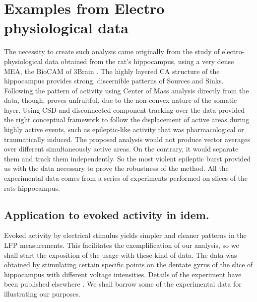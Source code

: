 \documentclass[12pt]{article}
\begin{document}
 
\section{Examples from Electro physiological data}

The necessity to create such analysis came originally from the study of
electro-physiological data obtained from the rat's hippocampus, using
a very dense MEA, the BioCAM of 3Brain \cite{BioCAM}. 
The highly layered CA structure of the hippocampus provides strong, discernible patterns of Sources and Sinks. Following the pattern of activity using Center of Mass analysis directly from the data, though, proves unfruitful, due to the non-convex nature of the somatic layer. Using CSD and disconnected component tracking over the data provided the right conceptual framework to follow the displacement of active areas during highly active events, such as epileptic-like activity that was pharmacological
or traumatically induced. The proposed analysis would not produce vector averages over different simultaneously active areas. On the contrary, it would separate them and track them independently. So the most violent epileptic burst provided us with the data necessary to prove the robustness of the method.
All the experimental data comes from a series of experiments
performed on slices of the rats hippocampus. 



\subsection{Application to evoked activity in idem.}\label{sec:evocada}

Evoked activity by electrical stimulus yields simpler and cleaner patterns in the LFP
measurements. This facilitates the exemplification of our analysis, so we shall
start the exposition of the usage with these kind of data.
The data was obtained by stimulating certain specific points on the dentate gyrus
of the slice of hippocampus with different voltage intensities. Details of the experiment
have been published elsewhere \cite{Franco2018}. We shall borrow some of
the experimental data for illustrating our purposes.
\end{document}
